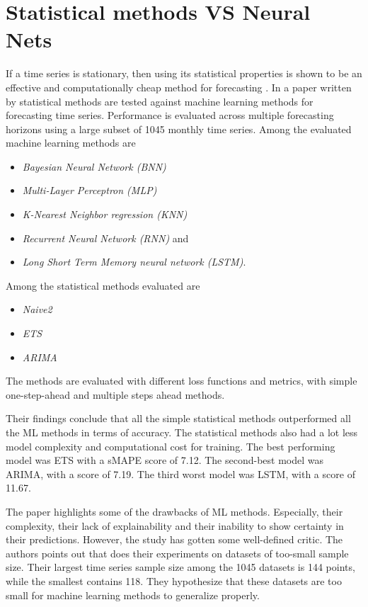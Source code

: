 \section{Statistical methods VS Neural Nets}
\label{section:RelatedWork:Statistical-NN}

If a time series is stationary, then using its statistical properties is shown to be an effective and computationally cheap method for forecasting
\cite{Makridakis2018}.
In a paper written by \citeauthor{Makridakis2018} statistical methods are tested against machine learning methods for
forecasting time series.
Performance is evaluated across multiple forecasting horizons using a large subset of 1045 monthly time series.
Among the evaluated machine learning methods are

\begin{itemize}
  \item \textit{Bayesian Neural Network (BNN)}
  \item \textit{Multi-Layer Perceptron (MLP)}
  \item \textit{K-Nearest Neighbor regression (KNN)}
  \item \textit{Recurrent Neural Network (RNN)} and
  \item \textit{Long Short Term Memory neural network (LSTM)}.
\end{itemize}

Among the statistical methods evaluated are

\begin{itemize}
  \item \textit{Naive2}
  \item \textit{ETS}
  \item \textit{ARIMA}
\end{itemize}
The methods are evaluated with different loss functions and metrics, with simple one-step-ahead and multiple steps ahead methods.

Their findings conclude that all the simple statistical methods outperformed all the ML methods in terms of accuracy.
The statistical methods also had a lot less model complexity and computational cost for training.
The best performing model was ETS with a sMAPE score of 7.12.
The second-best model was ARIMA, with a score of 7.19.
The third worst model was LSTM, with a score of 11.67.

The paper \cite{Makridakis2018} highlights some of the drawbacks of ML methods. Especially, their complexity,
their lack of explainability and their inability to show certainty in their predictions.
However, the study has gotten some well-defined critic. The authors \citeauthor*{Cerqueira2019} points
out that \cite{Makridakis2018} does their experiments on datasets of too-small sample size.
Their largest time series sample size among the 1045 datasets is 144 points, while the smallest contains 118.
They hypothesize that these datasets are too small for machine learning methods to generalize properly.

